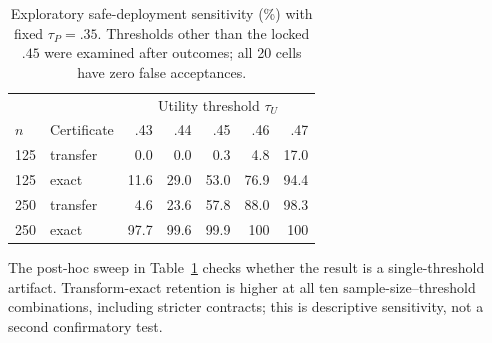 \begin{table}[t]
\centering
\small
\setlength{\tabcolsep}{2.6pt}
\begin{tabular}{llrrrrr}
\hline
&& \multicolumn{5}{c}{Utility threshold $\tau_U$} \\
$n$ & Certificate & .43 & .44 & .45 & .46 & .47 \\
\hline
125 & transfer & 0.0 & 0.0 & 0.3 & 4.8 & 17.0 \\
125 & exact & 11.6 & 29.0 & 53.0 & 76.9 & 94.4 \\
250 & transfer & 4.6 & 23.6 & 57.8 & 88.0 & 98.3 \\
250 & exact & 97.7 & 99.6 & 99.9 & 100 & 100 \\
\hline
\end{tabular}
\caption{Exploratory safe-deployment sensitivity (\%) with fixed
$\tau_P=.35$. Thresholds other than the locked $.45$ were examined after
outcomes; all 20 cells have zero false acceptances.}
\label{tab:thresholds}
\end{table}

The post-hoc sweep in Table~\ref{tab:thresholds} checks whether the result is a
single-threshold artifact. Transform-exact retention is higher at all ten
sample-size--threshold combinations, including stricter contracts; this is
descriptive sensitivity, not a second confirmatory test.
